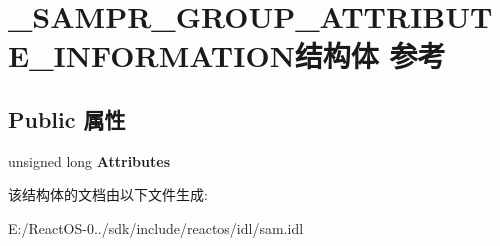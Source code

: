 \hypertarget{struct___s_a_m_p_r___g_r_o_u_p___a_t_t_r_i_b_u_t_e___i_n_f_o_r_m_a_t_i_o_n}{}\section{\+\_\+\+S\+A\+M\+P\+R\+\_\+\+G\+R\+O\+U\+P\+\_\+\+A\+T\+T\+R\+I\+B\+U\+T\+E\+\_\+\+I\+N\+F\+O\+R\+M\+A\+T\+I\+O\+N结构体 参考}
\label{struct___s_a_m_p_r___g_r_o_u_p___a_t_t_r_i_b_u_t_e___i_n_f_o_r_m_a_t_i_o_n}
\subsection*{Public 属性}
\begin{DoxyCompactItemize}
\item 
\mbox{\label{struct___s_a_m_p_r___g_r_o_u_p___a_t_t_r_i_b_u_t_e___i_n_f_o_r_m_a_t_i_o_n_a9fabe472c669e0dc29c29335b0444f98}} 
unsigned long {\bfseries Attributes}
\end{DoxyCompactItemize}


该结构体的文档由以下文件生成\+:\begin{DoxyCompactItemize}
\item 
E\+:/\+React\+O\+S-\/0../sdk/include/reactos/idl/sam.\+idl\end{DoxyCompactItemize}
